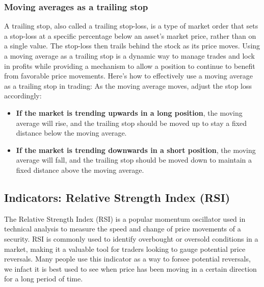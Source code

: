 \documentclass{report}
\begin{document}
     \subsubsection{Moving averages as a trailing stop}
     \bigbreak \noindent 
     A trailing stop, also called a trailing stop-loss, is a type of market order that sets a stop-loss at a specific percentage below an asset's market price, rather than on a single value. The stop-loss then trails behind the stock as its price moves.
     \bigbreak \noindent 
     Using a moving average as a trailing stop is a dynamic way to manage trades and lock in profits while providing a mechanism to allow a position to continue to benefit from favorable price movements. Here's how to effectively use a moving average as a trailing stop in trading:
     \bigbreak \noindent 
     As the moving average moves, adjust the stop loss accordingly:
     \begin{itemize}
         \item \textbf{If the market is trending upwards in a long position}, the moving average will rise, and the trailing stop should be moved up to stay a fixed distance below the moving average.
         \item \textbf{If the market is trending downwards in a short position}, the moving average will fall, and the trailing stop should be moved down to maintain a fixed distance above the moving average.
     \end{itemize}

     \bigbreak \noindent 
     \subsection{Indicators: Relative Strength Index (RSI)}
     \bigbreak \noindent 
     The Relative Strength Index (RSI) is a popular momentum oscillator used in technical analysis to measure the speed and change of price movements of a security.
     \bigbreak \noindent 
     RSI is commonly used to identify overbought or oversold conditions in a market, making it a valuable tool for traders looking to gauge potential price reversals.
     \bigbreak \noindent 
     Many people use this indicator as a way to forsee potential reversals, we infact it is best used to see when price has been moving in a certain direction for a long period of time.
     \bigbreak \noindent 
\end{document}
